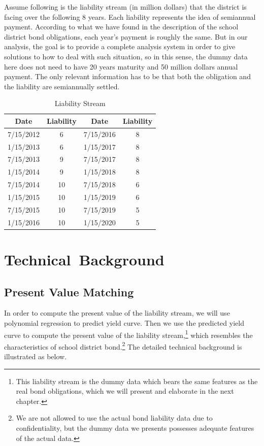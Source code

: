\documentclass[oneside,12pt]{report}
\begin{document}
{\noindent Assume following is the liability stream (in million dollars) that the district is facing over the following 8 years. Each liability represents the idea of semiannual payment. According to what we have found in the description of the school district bond obligations, each year's payment is roughly the same. But in our analysis, the goal is to provide a complete analysis system in order to give solutions to how to deal with such situation, so in this sense, the dummy data here does not need to have 20 years maturity and 50 million dollars annual payment. The only relevant information has to be that both the obligation and the liability are semiannually settled. 
\vspace{3mm}
\begin{table}[h]
\centering  
\begin{tabular}{|c|c|c|c|}
\hline
Date  &Liability  &Date  &Liability\\ \hline  
7/15/2012  &6  &7/15/2016  &8\\
1/15/2013  &6  &1/15/2017  &8\\ 
7/15/2013  &9  &7/15/2017  &8\\ 
1/15/2014  &9  &1/15/2018  &8\\ 
7/15/2014  &10 &7/15/2018  &6\\ 
1/15/2015  &10  &1/15/2019  &6\\ 
7/15/2015  &10  &7/15/2019  &5 \\ 
1/15/2016  &10  &1/15/2020  &5\\ \hline
\end{tabular}
\caption{Liability Stream}
\label{Table 1}
\end{table}

\chapter{Technical~Background}\label{}
\section{Present Value Matching}

In order to compute the present value of the liability stream, we will use polynomial regression to predict yield curve. Then we use the predicted yield curve to compute the present value of the liability stream,\footnote{This liability stream is the dummy data which bears the same features as the real bond obligations, which we will present and elaborate in the next chapter.} which resembles the characteristics of school district bond.\footnote{We are not allowed to use the actual bond liability data due to confidentiality, but the dummy data we presents possesses adequate features of the actual data.} The detailed technical background is illustrated as below.
}
\end{document}
